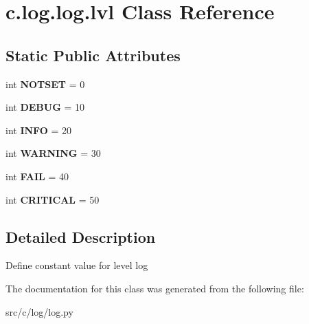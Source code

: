 \hypertarget{classc_1_1log_1_1log_1_1lvl}{}\section{c.\+log.\+log.\+lvl Class Reference}
\label{classc_1_1log_1_1log_1_1lvl}
\subsection*{Static Public Attributes}
\begin{DoxyCompactItemize}
\item 
\hypertarget{classc_1_1log_1_1log_1_1lvl_aff271eca26d2b9f8fd435a0ed2dfa495}{}int {\bfseries N\+O\+T\+S\+E\+T} = 0\label{classc_1_1log_1_1log_1_1lvl_aff271eca26d2b9f8fd435a0ed2dfa495}

\item 
\hypertarget{classc_1_1log_1_1log_1_1lvl_aa443836356d848cbb783208773379b70}{}int {\bfseries D\+E\+B\+U\+G} = 10\label{classc_1_1log_1_1log_1_1lvl_aa443836356d848cbb783208773379b70}

\item 
\hypertarget{classc_1_1log_1_1log_1_1lvl_a1c4315e1a0ddd986ff857a8323e4faba}{}int {\bfseries I\+N\+F\+O} = 20\label{classc_1_1log_1_1log_1_1lvl_a1c4315e1a0ddd986ff857a8323e4faba}

\item 
\hypertarget{classc_1_1log_1_1log_1_1lvl_a20f4e4c353c3ce8f417c543ecad5b862}{}int {\bfseries W\+A\+R\+N\+I\+N\+G} = 30\label{classc_1_1log_1_1log_1_1lvl_a20f4e4c353c3ce8f417c543ecad5b862}

\item 
\hypertarget{classc_1_1log_1_1log_1_1lvl_a8a2f617191b9bb0ba75c64638d5967ce}{}int {\bfseries F\+A\+I\+L} = 40\label{classc_1_1log_1_1log_1_1lvl_a8a2f617191b9bb0ba75c64638d5967ce}

\item 
\hypertarget{classc_1_1log_1_1log_1_1lvl_a4296c538432d6a1759241d6dc7e73b9a}{}int {\bfseries C\+R\+I\+T\+I\+C\+A\+L} = 50\label{classc_1_1log_1_1log_1_1lvl_a4296c538432d6a1759241d6dc7e73b9a}

\end{DoxyCompactItemize}


\subsection{Detailed Description}
\begin{DoxyVerb}Define constant value for level log
\end{DoxyVerb}
 

The documentation for this class was generated from the following file\+:\begin{DoxyCompactItemize}
\item 
src/c/log/log.\+py\end{DoxyCompactItemize}
